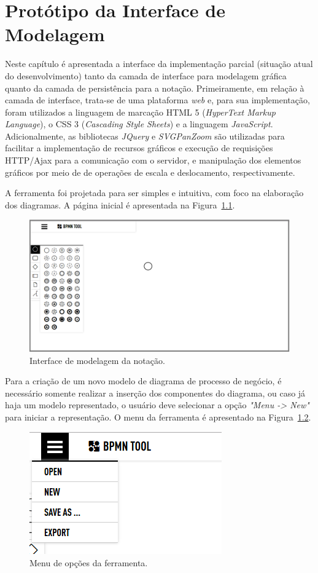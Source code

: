 \chapter{Protótipo da Interface de Modelagem}
\label{cp:prototipo}

Neste capítulo é apresentada a interface da implementação parcial (situação atual do desenvolvimento) tanto da camada de interface para modelagem gráfica quanto da camada de persistência para a notação.
Primeiramente, em relação à camada de interface, trata-se de uma plataforma \textit{web} e, para sua implementação, foram utilizados a linguagem de marcação HTML 5 (\textit{HyperText Markup Language}), o CSS 3 (\textit{Cascading Style Sheets}) e a linguagem \textit{JavaScript}. Adicionalmente, as bibliotecas \textit{JQuery} e \textit{SVGPanZoom} são utilizadas para facilitar a implementação de recursos gráficos e execução de requisições HTTP/Ajax para a comunicação com o servidor, e manipulação dos elementos gráficos por meio de de operações de escala e deslocamento, respectivamente.

A ferramenta foi projetada para ser simples e intuitiva, com foco na elaboração dos diagramas. A página inicial é apresentada na Figura~\ref{inicial}.

\begin{figure}[!htb]
\centering
\includegraphics[width=\textwidth]{images/ferramenta.png}
\caption{Interface de modelagem da notação.}
\label{inicial}
\end{figure}

Para a criação de um novo modelo de diagrama de processo de negócio, é necessário somente realizar a inserção dos componentes do diagrama, ou caso já haja um modelo representado, o usuário deve selecionar a opção \textit{"Menu -> New"} para iniciar a representação. O menu da ferramenta é apresentado na Figura~\ref{menu}.

\begin{figure}[!htb]
\centering
\includegraphics[scale=0.75]{images/menu.png}
\caption{Menu de opções da ferramenta.}
\label{menu}
\end{figure}

